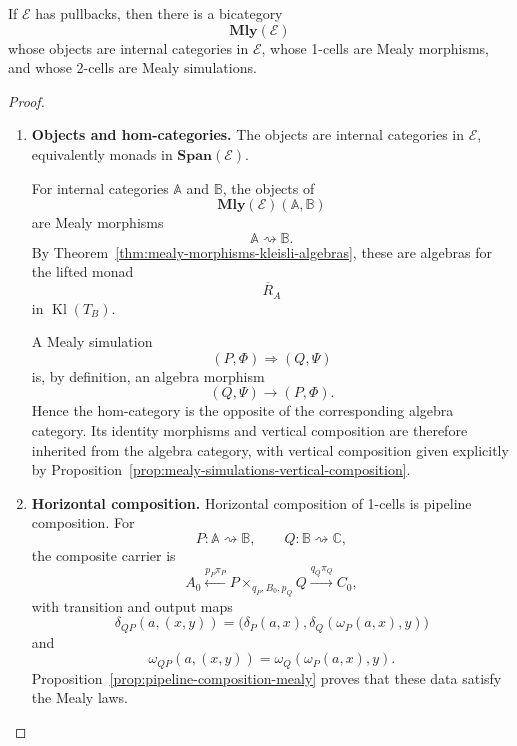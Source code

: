 \begin{theorem}
\label{thm:mealy-bicategory}
    If \(\mathcal E\) has pullbacks, then there is a bicategory
    \[
        \mathbf{Mly}(\mathcal E)
    \]
    whose objects are internal categories in \(\mathcal E\), whose 1-cells are
    Mealy morphisms, and whose 2-cells are Mealy simulations.
\end{theorem}
\begin{proof}
    \leavevmode
    \begin{enumerate}
        \item \textbf{Objects and hom-categories.}
        The objects are internal categories in \(\mathcal E\), equivalently
        monads in \(\mathbf{Span}(\mathcal E)\).

        For internal categories \(\mathbb A\) and \(\mathbb B\), the objects of
        \[
            \mathbf{Mly}(\mathcal E)(\mathbb A,\mathbb B)
        \]
        are Mealy morphisms
        \[
            \mathbb A\rightsquigarrow\mathbb B.
        \]
        By Theorem~\ref{thm:mealy-morphisms-kleisli-algebras}, these are
        algebras for the lifted monad
        \[
            \overline R_A
        \]
        in \(\operatorname{Kl}(T_B)\).

        A Mealy simulation
        \[
            (P,\Phi)\Rightarrow(Q,\Psi)
        \]
        is, by definition, an algebra morphism
        \[
            (Q,\Psi)\to(P,\Phi).
        \]
        Hence the hom-category is the opposite of the corresponding algebra
        category. Its identity morphisms and vertical composition are
        therefore inherited from the algebra category, with vertical
        composition given explicitly by
        Proposition~\ref{prop:mealy-simulations-vertical-composition}.

        \item \textbf{Horizontal composition.}
        Horizontal composition of 1-cells is pipeline composition. For
        \[
            P:\mathbb A\rightsquigarrow\mathbb B,
            \qquad
            Q:\mathbb B\rightsquigarrow\mathbb C,
        \]
        the composite carrier is
        \[
            A_0
            \xleftarrow{p_P\pi_P}
            P\times_{q_P,B_0,p_Q}Q
            \xrightarrow{q_Q\pi_Q}
            C_0,
        \]
        with transition and output maps
        \[
            \delta_{QP}(a,(x,y))
            =
            \bigl(
                \delta_P(a,x),
                \delta_Q(\omega_P(a,x),y)
            \bigr)
        \]
        and
        \[
            \omega_{QP}(a,(x,y))
            =
            \omega_Q(\omega_P(a,x),y).
        \]
        Proposition~\ref{prop:pipeline-composition-mealy} proves that these
        data satisfy the Mealy laws.


\end{enumerate}
\end{proof}
